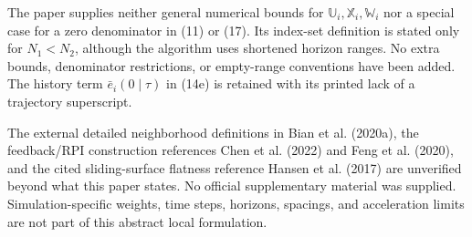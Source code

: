 \documentclass{article}
\begin{document}
The paper supplies neither general numerical bounds for $\mathbb U_i,\mathbb X_i,\mathbb W_i$ nor a special case for a zero denominator in (11) or (17). Its index-set definition is stated only for $N_1<N_2$, although the algorithm uses shortened horizon ranges. No extra bounds, denominator restrictions, or empty-range conventions have been added. The history term $\bar e_i(0\mid\tau)$ in (14e) is retained with its printed lack of a trajectory superscript.

The external detailed neighborhood definitions in Bian et al. (2020a), the feedback/RPI construction references Chen et al. (2022) and Feng et al. (2020), and the cited sliding-surface flatness reference Hansen et al. (2017) are unverified beyond what this paper states. No official supplementary material was supplied. Simulation-specific weights, time steps, horizons, spacings, and acceleration limits are not part of this abstract local formulation.
\end{document}
